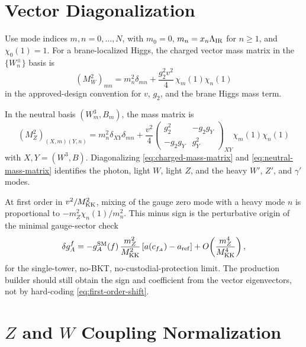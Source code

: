 \documentclass[11pt]{article}
\begin{document}
\section{Vector Diagonalization}

Use mode indices \(m,n=0,\ldots,N\), with \(m_0=0\), \(m_n=x_n\Lambda_{\rm IR}\)
for \(n\ge1\), and \(\chi_0(1)=1\).  For a brane-localized Higgs, the charged
vector mass matrix in the \(\{W_n^\pm\}\) basis is
\begin{equation}
  \boxed{
  (M_W^2)_{mn}
  =
  m_n^2\delta_{mn}
  +\frac{g_2^2 v^2}{4}\,\chi_m(1)\chi_n(1)}
  \label{eq:charged-mass-matrix}
\end{equation}
in the approved-design convention for \(v\), \(g_2\), and the brane Higgs
mass term.

In the neutral basis \((W^3_m,B_m)\), the mass matrix is
\begin{equation}
  \boxed{
  (M_Z^2)_{(X,m)(Y,n)}
  =
  m_n^2\delta_{XY}\delta_{mn}
  +\frac{v^2}{4}
  \begin{pmatrix}
    g_2^2 & -g_2g_Y\\
    -g_2g_Y & g_Y^2
  \end{pmatrix}_{XY}
  \chi_m(1)\chi_n(1)}
  \label{eq:neutral-mass-matrix}
\end{equation}
with \(X,Y=(W^3,B)\).  Diagonalizing
\eqref{eq:charged-mass-matrix} and \eqref{eq:neutral-mass-matrix} identifies
the photon, light \(W\), light \(Z\), and the heavy \(W'\), \(Z'\), and
\(\gamma'\) modes.

At first order in \(v^2/M_{\rm KK}^2\), mixing of the gauge zero mode with a
heavy mode \(n\) is proportional to
\(-m_Z^2\chi_n(1)/m_n^2\).  This minus sign is the perturbative origin of the
minimal gauge-sector check
\begin{equation}
  \delta g_A^f
  =
  -g_A^{\rm SM}(f)\,
  \frac{m_Z^2}{M_{\rm KK}^2}
  \left[a(c_{f_A})-a_{\rm ref}\right]
  +O\!\left(\frac{m_Z^4}{M_{\rm KK}^4}\right),
  \label{eq:first-order-shift}
\end{equation}
for the single-tower, no-BKT, no-custodial-protection limit.  The production
builder should still obtain the sign and coefficient from the vector
eigenvectors, not by hard-coding \eqref{eq:first-order-shift}.

\section{\texorpdfstring{\(Z\) and \(W\)}{Z and W} Coupling Normalization}
\end{document}
